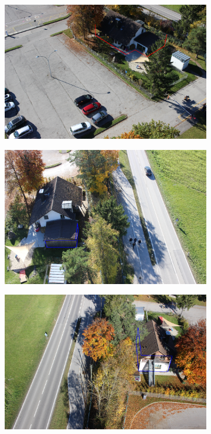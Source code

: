\documentclass[remotesensing,article,accept,moreauthors,pdftex,10pt,a4paper]{mdpi}
\theoremstyle{mdpi}
\newcounter{ex}
\newcounter{re}
\begin{document}
\begin{figure}[H]
\begin{subfigure}[tbp]{0.31\columnwidth}
           \includegraphics[width=\textwidth]{optimize/IMG_1400_osm_ori.png}
           \caption[]{}%
           {{\small }}   
           \label{fig:5i}
       \end{subfigure}
       \begin{subfigure}[tbp]{0.31\columnwidth}
           \centering
           \includegraphics[width=\textwidth]{optimize/IMG_1367_xyzh.png}
           \caption[]{}%
           {{\small }}
           \label{fig:5j}
       \end{subfigure}
       \begin{subfigure}[tbp]{0.31\columnwidth}  
           \centering 
           \includegraphics[width=\textwidth]{optimize/IMG_1604_xyzh.png}

\end{subfigure}
\end{figure}
\end{document}
